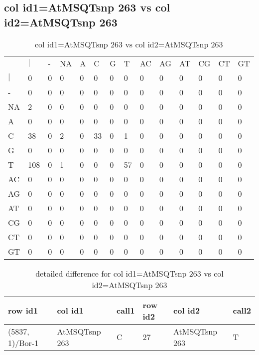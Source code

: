 \subsection{col id1=AtMSQTsnp 263 vs col id2=AtMSQTsnp 263}
\begin{center}
\begin{longtable}{|l|l|l|l|l|l|l|l|l|l|l|l|l|l|}
\caption{col id1=AtMSQTsnp 263 vs col id2=AtMSQTsnp 263} \label{table_dm606}\\
\hline
\\
\hline
&$|$&-&NA&A&C&G&T&AC&AG&AT&CG&CT&GT\\
$|$&0&0&0&0&0&0&0&0&0&0&0&0&0\\
-&0&0&0&0&0&0&0&0&0&0&0&0&0\\
NA&2&0&0&0&0&0&0&0&0&0&0&0&0\\
A&0&0&0&0&0&0&0&0&0&0&0&0&0\\
C&38&0&2&0&33&0&1&0&0&0&0&0&0\\
G&0&0&0&0&0&0&0&0&0&0&0&0&0\\
T&108&0&1&0&0&0&57&0&0&0&0&0&0\\
AC&0&0&0&0&0&0&0&0&0&0&0&0&0\\
AG&0&0&0&0&0&0&0&0&0&0&0&0&0\\
AT&0&0&0&0&0&0&0&0&0&0&0&0&0\\
CG&0&0&0&0&0&0&0&0&0&0&0&0&0\\
CT&0&0&0&0&0&0&0&0&0&0&0&0&0\\
GT&0&0&0&0&0&0&0&0&0&0&0&0&0\\
\hline
\end{longtable}
\end{center}

\begin{center}
\begin{longtable}{|l|l|l|l|l|l|}
\caption{detailed difference for col id1=AtMSQTsnp 263 vs col id2=AtMSQTsnp 263} \label{table_dm607}\\
\hline
row id1&col id1&call1&row id2&col id2&call2\\
\hline
(5837, 1)/Bor-1&AtMSQTsnp 263&C&27&AtMSQTsnp 263&T\\
\hline
\end{longtable}
\end{center}

